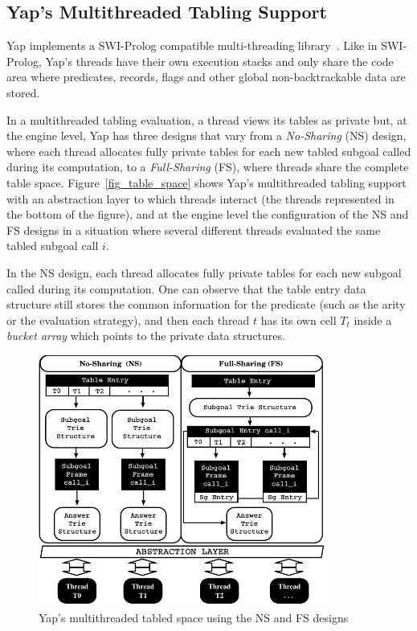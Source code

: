 \documentclass{llncs}
\begin{document}
\subsection{Yap's Multithreaded Tabling Support}

Yap implements a SWI-Prolog compatible multi-threading
library~\cite{Wielemaker-03}. Like in SWI-Prolog, Yap's threads have
their own execution stacks and only share the code area where
predicates, records, flags and other global non-backtrackable data are
stored. 

In a multithreaded tabling evaluation, a thread views its tables as
private but, at the engine level, Yap has three designs that vary from
a \emph{No-Sharing} (NS) design, where each thread allocates fully
private tables for each new tabled subgoal called during its
computation, to a \emph{Full-Sharing} (FS), where threads share the
complete table space. Figure~\ref{fig_table_space} shows Yap's
multithreaded tabling support with an abstraction layer to which
threads interact (the threads represented in the bottom of the
figure), and at the engine level the configuration of the NS and FS
designs in a situation where several different threads evaluated the
same tabled subgoal call $i$. 

In the NS design, each thread allocates fully private tables for each
new subgoal called during its computation. One can observe that the
table entry data structure still stores the common information for the
predicate (such as the arity or the evaluation strategy), and then
each thread $t$ has its own cell $T_t$ inside a \emph{bucket array}
which points to the private data structures.

\begin{figure}[!ht]
\vspace{-0.5\intextsep}
\centering
\includegraphics[width=9.5cm]{figures/yap-mt.pdf}
\caption{Yap's multithreaded tabled space using the NS and FS designs}
\label{fig_yap_mt_support}
\vspace{-1.0\intextsep}
\end{figure}
\end{document}

